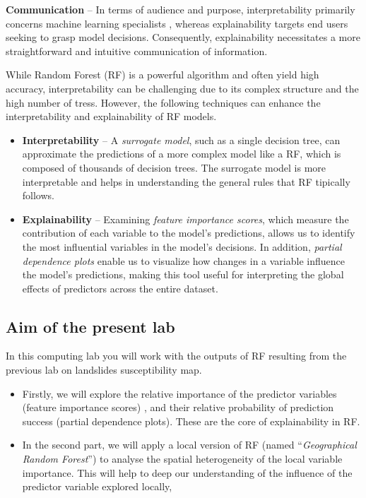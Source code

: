 \documentclass[
]{article}
\begin{document}
\textbf{Communication} -- In terms of audience and purpose, interpretability primarily concerns machine learning specialists , whereas explainability targets end users seeking to grasp model decisions.
Consequently, explainability necessitates a more straightforward and intuitive communication of information.

While Random Forest (RF) is a powerful algorithm and often yield high accuracy, interpretability can be challenging due to its complex structure and the high number of tress.
However, the following techniques can enhance the interpretability and explainability of RF models.

\begin{itemize}
\item
  \textbf{Interpretability} -- A \emph{surrogate model}, such as a single decision tree, can approximate the predictions of a more complex model like a RF, which is composed of thousands of decision trees.
  The surrogate model is more interpretable and helps in understanding the general rules that RF tipically follows.
\item
  \textbf{Explainability} -- Examining \emph{feature importance scores}, which measure the contribution of each variable to the model's predictions, allows us to identify the most influential variables in the model's decisions.
  In addition, \emph{partial dependence plots} enable us to visualize how changes in a variable influence the model's predictions, making this tool useful for interpreting the global effects of predictors across the entire dataset.
\end{itemize}

\subsection{Aim of the present lab}\label{aim-of-the-present-lab}

In this computing lab you will work with the outputs of RF resulting from the previous lab on landslides susceptibility map.

\begin{itemize}
\item
  Firstly, we will explore the relative importance of the predictor variables (feature importance scores) , and their relative probability of prediction success (partial dependence plots).
  These are the core of explainability in RF.
\item
  In the second part, we will apply a local version of RF (named ``\emph{Geographical Random Forest}'') to analyse the spatial heterogeneity of the local variable importance.
  This will help to deep our understanding of the influence of the predictor variable explored locally,
\end{itemize}
\end{document}
